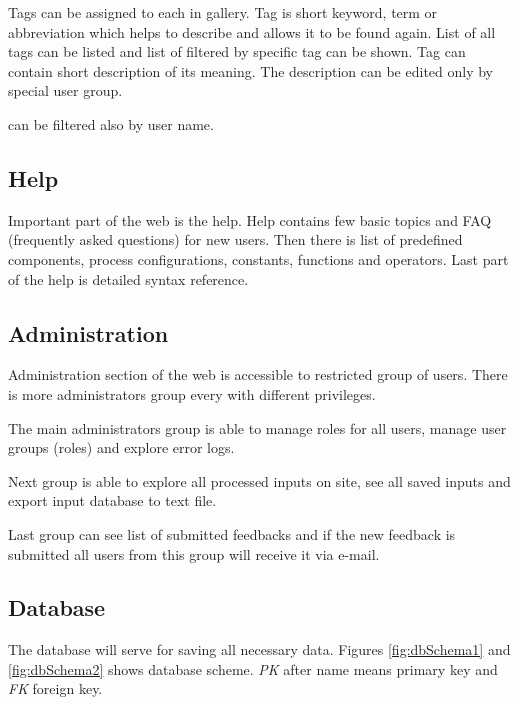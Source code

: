 Tags can be assigned to each \lsystem in gallery.
Tag is short keyword, term or abbreviation which helps to describe \lsystem and allows it to be found again.
List of all tags can be listed and list of \lsystems filtered by specific tag can be shown.
Tag can contain short description of its meaning.
The description can be edited only by special user group.

\lsystems can be filtered also by user name.


\subsection{Help}

Important part of the web is the help.
Help contains few basic topics and FAQ (frequently asked questions) for new users.
Then there is list of predefined components, process configurations, constants, functions and operators.
Last part of the help is detailed syntax reference.


\subsection{Administration}

Administration section of the web is accessible to restricted group of users.
There is more administrators group every with different privileges.

The main administrators group is able to manage roles for all users, manage user groups (roles) and explore error logs.

Next group is able to explore all processed inputs on site, see all saved inputs and export input database to text file.

Last group can see list of submitted feedbacks and if the new feedback is submitted all users from this group will receive it via e-mail.


\subsection{Database}

The database will serve for saving all necessary data.
Figures \ref{fig:dbSchema1} and \ref{fig:dbSchema2} shows database scheme.
\emph{PK} after name means primary key and \emph{FK} foreign key.


